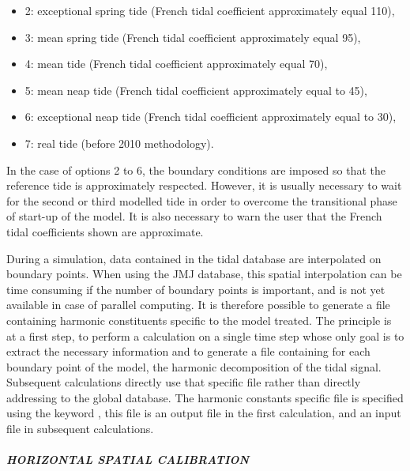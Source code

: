 \begin{itemize}
\item [\nonumber] 2: exceptional spring tide (French tidal coefficient approximately equal 110),

\item [\nonumber] 3: mean spring tide (French tidal coefficient approximately equal 95),

\item [\nonumber] 4: mean tide (French tidal coefficient approximately equal 70),

\item [\nonumber] 5: mean neap tide (French tidal coefficient approximately equal to 45),

\item [\nonumber] 6: exceptional neap tide (French tidal coefficient approximately equal to 30),

\item [\nonumber] 7: real tide (before 2010 methodology).
\end{itemize}

 In the case of options 2 to 6, the boundary conditions are imposed so that the reference tide is approximately respected. However, it is usually necessary to wait for the second or third modelled tide in order to overcome the transitional phase of start-up of the model. It is also necessary to warn the user that the French tidal coefficients shown are approximate.

 During a simulation, data contained in the tidal database are interpolated on boundary points. When using the JMJ database, this spatial interpolation can be time consuming if the number of boundary points is important, and is not yet available in case of parallel computing. It is therefore possible to generate a file containing harmonic constituents specific to the model treated. The principle is at a first step, to perform a calculation on a single time step whose only goal is to extract the necessary information and to generate a file containing for each boundary point of the model, the harmonic decomposition of the tidal signal. Subsequent calculations directly use that specific file rather than directly addressing to the global database. The harmonic constants specific file is specified using the keyword , this file is an output file in the first calculation, and an input file in subsequent calculations.


\subparagraph{ HORIZONTAL SPATIAL CALIBRATION}

